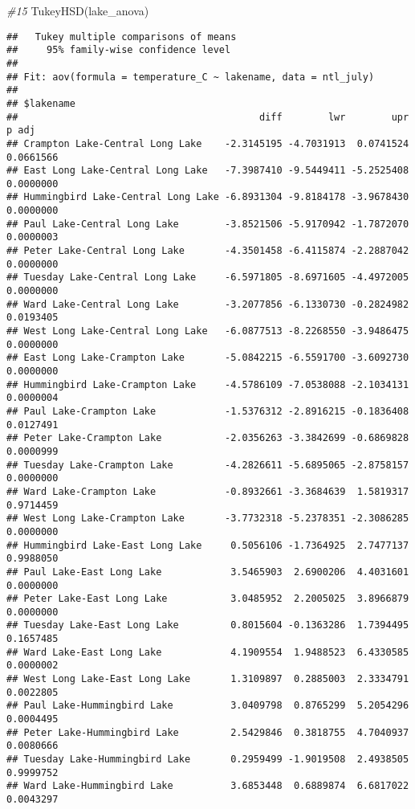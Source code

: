 \documentclass[
]{article}
\newenvironment{Shaded}{\begin{snugshade}}{\end{snugshade}}
\newcommand{\CommentTok}[1]{\textcolor[rgb]{0.56,0.35,0.01}{\textit{#1}}}
\newcommand{\FunctionTok}[1]{\textcolor[rgb]{0.00,0.00,0.00}{#1}}
\newcommand{\NormalTok}[1]{#1}
\begin{document}
\begin{Shaded}
\begin{Highlighting}[]
\CommentTok{\#15}
\FunctionTok{TukeyHSD}\NormalTok{(lake\_anova)}
\end{Highlighting}
\end{Shaded}

\begin{verbatim}
##   Tukey multiple comparisons of means
##     95% family-wise confidence level
## 
## Fit: aov(formula = temperature_C ~ lakename, data = ntl_july)
## 
## $lakename
##                                          diff        lwr        upr     p adj
## Crampton Lake-Central Long Lake    -2.3145195 -4.7031913  0.0741524 0.0661566
## East Long Lake-Central Long Lake   -7.3987410 -9.5449411 -5.2525408 0.0000000
## Hummingbird Lake-Central Long Lake -6.8931304 -9.8184178 -3.9678430 0.0000000
## Paul Lake-Central Long Lake        -3.8521506 -5.9170942 -1.7872070 0.0000003
## Peter Lake-Central Long Lake       -4.3501458 -6.4115874 -2.2887042 0.0000000
## Tuesday Lake-Central Long Lake     -6.5971805 -8.6971605 -4.4972005 0.0000000
## Ward Lake-Central Long Lake        -3.2077856 -6.1330730 -0.2824982 0.0193405
## West Long Lake-Central Long Lake   -6.0877513 -8.2268550 -3.9486475 0.0000000
## East Long Lake-Crampton Lake       -5.0842215 -6.5591700 -3.6092730 0.0000000
## Hummingbird Lake-Crampton Lake     -4.5786109 -7.0538088 -2.1034131 0.0000004
## Paul Lake-Crampton Lake            -1.5376312 -2.8916215 -0.1836408 0.0127491
## Peter Lake-Crampton Lake           -2.0356263 -3.3842699 -0.6869828 0.0000999
## Tuesday Lake-Crampton Lake         -4.2826611 -5.6895065 -2.8758157 0.0000000
## Ward Lake-Crampton Lake            -0.8932661 -3.3684639  1.5819317 0.9714459
## West Long Lake-Crampton Lake       -3.7732318 -5.2378351 -2.3086285 0.0000000
## Hummingbird Lake-East Long Lake     0.5056106 -1.7364925  2.7477137 0.9988050
## Paul Lake-East Long Lake            3.5465903  2.6900206  4.4031601 0.0000000
## Peter Lake-East Long Lake           3.0485952  2.2005025  3.8966879 0.0000000
## Tuesday Lake-East Long Lake         0.8015604 -0.1363286  1.7394495 0.1657485
## Ward Lake-East Long Lake            4.1909554  1.9488523  6.4330585 0.0000002
## West Long Lake-East Long Lake       1.3109897  0.2885003  2.3334791 0.0022805
## Paul Lake-Hummingbird Lake          3.0409798  0.8765299  5.2054296 0.0004495
## Peter Lake-Hummingbird Lake         2.5429846  0.3818755  4.7040937 0.0080666
## Tuesday Lake-Hummingbird Lake       0.2959499 -1.9019508  2.4938505 0.9999752
## Ward Lake-Hummingbird Lake          3.6853448  0.6889874  6.6817022 0.0043297

\end{verbatim}
\end{document}
